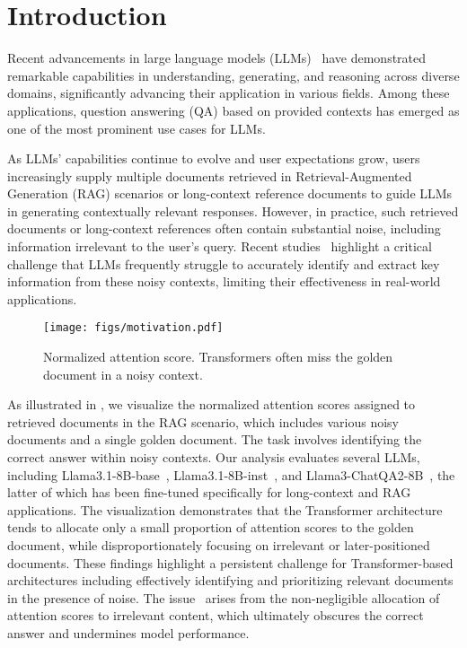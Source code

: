 \section{Introduction}

Recent advancements in large language models (LLMs)~\cite{openai2023gpt4, dubey2024llama3,yang2024qwen2_5,liu2024deepseekv3} have demonstrated remarkable capabilities in understanding, generating, and reasoning across diverse domains, significantly advancing their application in various fields. 
Among these applications, question answering (QA) based on provided contexts has emerged as one of the most prominent use cases for LLMs.

As LLMs' capabilities continue to evolve and user expectations grow, users increasingly supply multiple documents retrieved in Retrieval-Augmented Generation (RAG) scenarios or long-context reference documents to guide LLMs in generating contextually relevant responses.
However, in practice, such retrieved documents or long-context references often contain substantial noise, including information irrelevant to the user's query.
Recent studies~\cite{ye2025difftrans,liu2024lost} highlight a critical challenge that LLMs frequently struggle to accurately identify and extract key information from these noisy contexts, limiting their effectiveness in real-world applications.

\begin{figure}[!tb]
    \centering
    \texttt{[image: figs/motivation.pdf]} 
    \caption{Normalized attention score. Transformers often miss the golden document in a noisy context.} 
    \label{fig:motivation}
\end{figure}

As illustrated in , we visualize the normalized attention scores assigned to retrieved documents in the RAG scenario, which includes various noisy documents and a single golden document. 
The task involves identifying the correct answer within noisy contexts. 
Our analysis evaluates several LLMs, including Llama3.1-8B-base~\cite{meta2024llama3_1}, Llama3.1-8B-inst~\cite{meta2024llama3_1}, and Llama3-ChatQA2-8B~\cite{xu2024chatqa2}, the latter of which has been fine-tuned specifically for long-context and RAG applications. 
The visualization demonstrates that the Transformer architecture tends to allocate only a small proportion of attention scores to the golden document, while disproportionately focusing on irrelevant or later-positioned documents. 
These findings highlight a persistent challenge for Transformer-based architectures including effectively identifying and prioritizing relevant documents in the presence of noise. 
The issue~\cite{ye2025difftrans} arises from the non-negligible allocation of attention scores to irrelevant content, which ultimately obscures the correct answer and undermines model performance.


